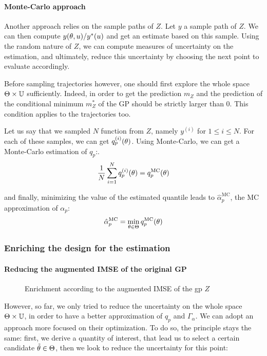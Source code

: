 \documentclass[../../Main_ManuscritThese.tex]{subfiles}
\newcommand\imgpath{/home/victor/acadwriting/Manuscrit/Text/Chapter4/img/}
\begin{document}
\paragraph{Monte-Carlo approach}
Another approach relies on the sample paths of $Z$. Let $y$ a sample path of $Z$. We can then compute $y(\theta, u)/y^*(u)$ and get an estimate based on this sample. 
Using the random nature of $Z$, we can compute measures of uncertainty on the estimation, and ultimately, reduce this uncertainty by choosing the next point to evaluate accordingly.

Before sampling trajectories however, one should first explore the whole space $\Theta \times \mathbb{U}$ sufficiently. Indeed, in order to get the prediction $m_Z$ and the prediction of the conditional minimum $m^*_{Z}$ of the GP should be strictly larger than $0$. This condition applies to the trajectories too.

Let us say that we sampled $N$ function from $Z$, namely $y^{(i)}$ for $1 \leq i \leq N$. For each of these samples, we can get $q^{(i)}_p(\theta)$. Using Monte-Carlo, we can get a Monte-Carlo estimation of $q_p$:.
\begin{equation}
 \frac{1}{N} \sum_{i=1}^N q_p^{(i)}(\theta) = q_p^{\mathrm{MC}}(\theta)
\end{equation}

and finally, minimizing the value of the estimated quantile leads to $\hat{\alpha}_p^{\mathrm{MC}}$, the MC approximation of $\alpha_p$: 
\begin{equation}
  \hat{\alpha}_p^{\mathrm{MC}} = \min_{\theta \in \Theta} q_p^{\mathrm{MC}}(\theta)
\end{equation}

\subsubsection{Enriching the design for the estimation}
\paragraph{Reducing the augmented IMSE of the original GP}

\begin{figure}[ht]
  \centering
  
  \caption{\label{fig:IMSE_enrichment_alpha} Enrichment according to the augmented IMSE of the gp $Z$}
\end{figure}

However, so far, we only tried to reduce the uncertainty on the whole space $\Theta \times \mathbb{U}$, in order to have a better approximation of $q_p$ and $\Gamma_{\alpha}$. We can adopt an approach more focused on their optimization. To do so, the principle stays the same: first, we derive a quantity of interest, that lead us to select a certain candidate $\tilde{\theta} \in \Theta$, then we look to reduce the uncertainty for this point:
\end{document}
